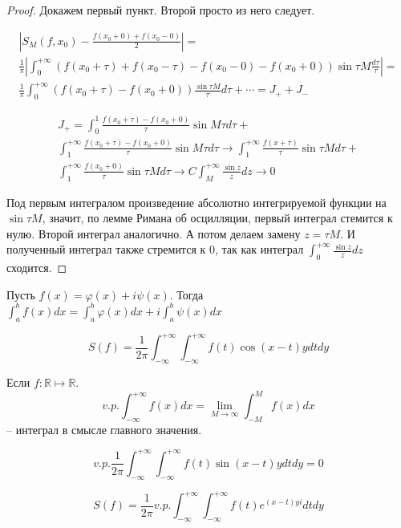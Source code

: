 \documentclass[document.tex]{subfiles}
\begin{document}
\begin{proof}
    Докажем первый пункт. Второй просто из него следует.

    \begin{multline*}
        |S_M(f, x_0) - \frac{f(x_0 + 0) + f(x_0 - 0)}{2}| = \\ \frac{1}{\pi} \left| \int_{0}^{+\infty} (f(x_0 + \tau) +
        f(x_0 - \tau) - f(x_0 - 0) - f(x_0 + 0)) \sin \tau M \frac{d\tau}{\tau} \right| = \\
        \frac{1}{\pi} \int_{0}^{+\infty} (f(x_0 + \tau) - f(x_0 + 0)) \frac{\sin \tau M}{\tau}d\tau + \cdots = 
        J_+ + J_-
    \end{multline*}

    \begin{multline*}
        J_+ = \int_{0}^{1} \frac{f(x_0 + \tau) - f(x_0 + 0)}{\tau} \sin M\tau d\tau + \\
        \int_{1}^{+\infty}\frac{f(x_0 + \tau) - f(x_0 + 0)}{\tau} \sin M\tau d\tau \rightarrow \int_{1}^{+\infty}
        \frac{f(x + \tau)}{\tau} \sin \tau M d\tau + \\ \int_{1}^{+\infty} \frac{f(x_0 + 0)}{\tau} \sin \tau M d\tau
        \rightarrow  C \int_{M}^{+\infty} \frac{\sin z}{z} dz \rightarrow 0
    \end{multline*}
    
    Под первым интегралом произведение абсолютно интегрируемой функции на $\sin \tau M$, значит, по лемме Римана об
    осцилляции, первый интеграл стемится к нулю.
    Второй интеграл аналогично. А потом делаем замену $z = \tau M$. И полученный интеграл также стремится к 0, так как
    интеграл $\int_{0}^{+\infty} \frac{\sin z}{z} dz$ сходится.
\end{proof}
\begin{definition}
    Пусть $f(x) = \varphi(x) + i \psi(x)$. Тогда $\int_{a}^{b} f(x)dx = \int_{a}^{b}\varphi(x)dx +
    i\int_{a}^{b}\psi(x)dx$
\end{definition}

\[
    S(f) = \frac{1}{2 \pi} \int_{-\infty}^{+\infty} \int_{-\infty}^{+\infty} f(t) \cos (x - t)y dt dy
\]

\begin{definition}
    Если $f: \mathbb{R} \mapsto \mathbb{R}$. 
    \[
        v.p. \int_{-\infty}^{+\infty} f(x)dx = \lim_{M \rightarrow \infty} \int_{-M}^{M}f(x)dx
    \] -- интеграл в смысле главного значения.
\end{definition}

\[
    v.p. \frac{1}{2 \pi} \int_{-\infty}^{+\infty} \int_{-\infty}^{+ \infty} f(t) \sin (x - t)y dt dy = 0
\]

\[
    S(f) = \frac{1}{2\pi} v.p. \int_{-\infty}^{+\infty} \int_{-\infty}^{+\infty} f(t) e^{(x - t)yi}dt dy
\]
\end{document}
